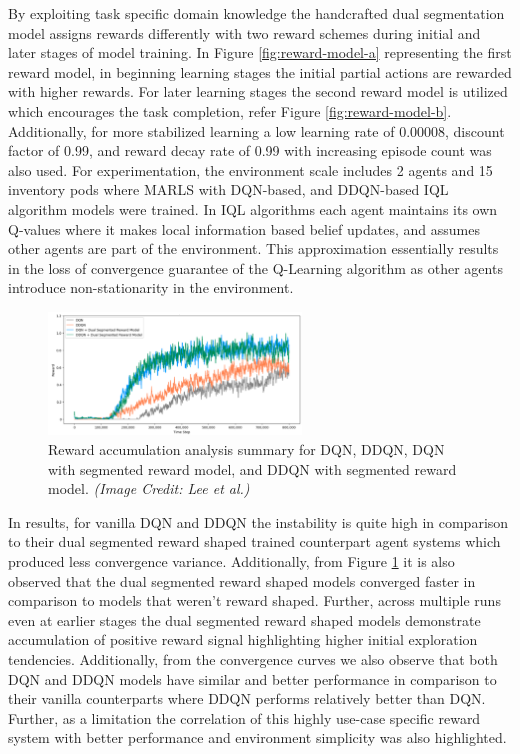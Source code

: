 \documentclass{article}
\begin{document}
By exploiting task specific domain knowledge the handcrafted dual segmentation model assigns rewards differently with two reward schemes during initial and later stages of model training.
In Figure \ref{fig:reward-model-a} representing the first reward model, in beginning learning stages the initial partial actions are rewarded with higher rewards.
For later learning stages the second reward model is utilized which encourages the task completion, refer Figure \ref{fig:reward-model-b}.
Additionally, for more stabilized learning a low learning rate of 0.00008, discount factor of 0.99, and reward decay rate of 0.99 with increasing episode count was also used.
For experimentation, the environment scale includes 2 agents and 15 inventory pods where MARLS with DQN-based, and DDQN-based IQL algorithm models were trained.
In IQL algorithms each agent maintains its own Q-values where it makes local information based belief updates, and assumes other agents are part of the environment.
This approximation essentially results in the loss of convergence guarantee of the Q-Learning algorithm as other agents introduce non-stationarity in the environment.


\begin{figure}[h]
    \centering
    \includegraphics[width=0.6\textwidth]{reward-shaping-result.png}
    \caption{Reward accumulation analysis summary for DQN, DDQN, DQN with segmented reward model, and DDQN with segmented reward model. \textit{(Image Credit: Lee et al.)}}
    \label{fig:reward-shaping-result}
\end{figure}


In results, for vanilla DQN and DDQN the instability is quite high in comparison to their dual segmented reward shaped trained counterpart agent systems which produced less convergence variance.
Additionally, from Figure \ref{fig:reward-shaping-result} it is also observed that the dual segmented reward shaped models converged faster in comparison to models that weren’t reward shaped.
Further, across multiple runs even at earlier stages the dual segmented reward shaped models demonstrate accumulation of positive reward signal highlighting higher initial exploration tendencies.
Additionally, from the convergence curves we also observe that both DQN and DDQN models have similar and better performance in comparison to their vanilla counterparts where DDQN performs relatively better than DQN.
Further, as a limitation the correlation of this highly use-case specific reward system with better performance and environment simplicity was also highlighted.
\end{document}
